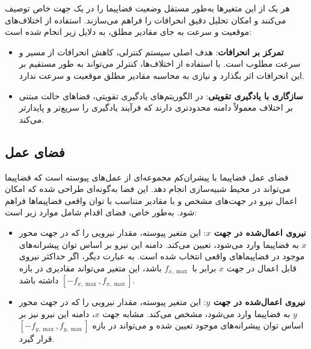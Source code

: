 هر یک از این متغیرها به‌طور مستقل وضعیت فضاپیما را در یک جهت خاص توصیف می‌کنند و امکان تحلیل دقیق انحرافات را فراهم می‌سازند.
استفاده از اختلاف‌های موقعیت و سرعت به جای مقادیر مطلق، به دلایل زیر انجام شده است:
\begin{itemize}
    \item \textbf{تمرکز بر انحرافات}: هدف اصلی سیستم کنترلی، کاهش انحرافات از مسیر و سرعت مطلوب است. با استفاده از اختلاف‌ها، کنترلر می‌تواند به طور مستقیم بر این انحرافات اثر بگذارد و نیازی به محاسبه مقادیر مطلق موقعیت و سرعت ندارد.
    \item \textbf{سازگاری با یادگیری تقویتی}: در الگوریتم‌های یادگیری تقویتی، فضاهای حالت مبتنی بر اختلاف معمولاً دامنه محدودتری دارند که فرآیند یادگیری را سریع‌تر و پایدارتر می‌کند.
\end{itemize}

	
	\subsection{فضای عمل }
	

	
		فضای عمل 
		فضاپیما با پیشران‌کم
		مجموعه‌ای از عمل‌های پیوسته است که فضاپیما می‌تواند در محیط شبیه‌سازی انجام دهد. این فضا به‌گونه‌ای طراحی شده که امکان اعمال نیرو در جهت‌های مشخص و با مقادیر متناسب با توان واقعی فضاپیماها فراهم شود. به‌طور خاص، فضای اقدام شامل موارد زیر است:
	
	\begin{itemize}
		\item \textbf{نیروی اعمال‌شده در جهت \( x \)}: این متغیر پیوسته، مقدار نیرویی را که در جهت محور \( x \) به فضاپیما وارد می‌شود، تعیین می‌کند. دامنه این نیرو بر اساس توان پیشرانه‌های موجود در فضاپیماهای واقعی انتخاب شده است. به عبارت دیگر، اگر حداکثر نیروی قابل اعمال در جهت \( x \) برابر با \( f_{x,\max} \) باشد، این متغیر می‌تواند مقادیری در بازه \( [-f_{x,\max}, f_{x,\max}] \) داشته باشد.
		
		\item \textbf{نیروی اعمال‌شده در جهت \( y \)}: این متغیر پیوسته، مقدار نیرویی را که در جهت محور \( y \) به فضاپیما وارد می‌شود، مشخص می‌کند. مشابه جهت \( x \)، دامنه این نیرو نیز بر اساس توان پیشرانه‌های موجود تعیین شده و می‌تواند در بازه \( [-f_{y,\max}, f_{y,\max}] \) قرار گیرد.
	\end{itemize}
	
